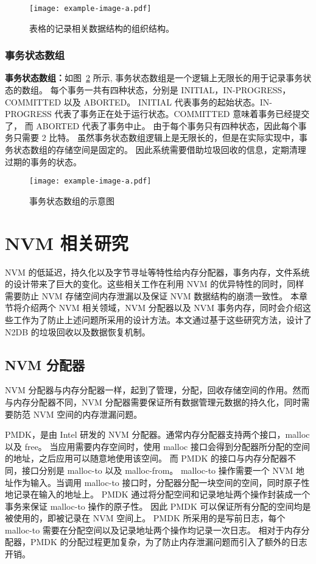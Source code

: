 \begin{figure}
    \centering
    \texttt{[image: example-image-a.pdf]}
    \caption{表格的记录相关数据结构的组织结构。}
    \label{fig:table}
\end{figure}

\subsubsection{事务状态数组}

\textbf{事务状态数组：}如图~\ref{fig:clog} 所示, 事务状态数组是一个逻辑上无限长的用于记录事务状态的数组。
每个事务一共有四种状态，分别是 INITIAL，IN-PROGRESS，COMMITTED 以及 ABORTED。
INITIAL 代表事务的起始状态。IN-PROGRESS 代表了事务正在处于运行状态。COMMITTED 意味着事务已经提交了，
而 ABORTED 代表了事务中止。
由于每个事务只有四种状态，因此每个事务只需要 2 比特。
虽然事务状态数组逻辑上是无限长的，但是在实际实现中，事务状态数组的存储空间是固定的。
因此系统需要借助垃圾回收的信息，定期清理过期的事务的状态。

\begin{figure}
    \centering
    \texttt{[image: example-image-a.pdf]}
    \caption{事务状态数组的示意图}
    \label{fig:clog}
\end{figure}


\section{NVM 相关研究}

NVM 的低延迟，持久化以及字节寻址等特性给内存分配器，事务内存，文件系统的设计带来了巨大的变化。这些相关工作在利用 NVM 的优异特性的同时，同样需要防止 NVM 存储空间内存泄漏以及保证 NVM 数据结构的崩溃一致性。
本章节将介绍两个 NVM 相关领域，NVM 分配器以及 NVM 事务内存，同时会介绍这些工作为了防止上述问题所采用的设计方法。本文通过基于这些研究方法，设计了 N2DB 的垃圾回收以及数据恢复机制。

\subsection{NVM 分配器}

NVM 分配器与内存分配器一样，起到了管理，分配，回收存储空间的作用。然而与内存分配器不同，NVM 分配器需要保证所有数据管理元数据的持久化，同时需要防范 NVM 空间的内存泄漏问题。

PMDK，是由 Intel 研发的 NVM 分配器\cite{pmdk}。通常内存分配器支持两个接口，malloc 以及 free。
当应用需要内存空间时，使用 malloc 接口会得到分配器所分配的空间的地址，之后应用可以随意地使用该空间。
而 PMDK 的接口与内存分配器不同，接口分别是 malloc-to 以及 malloc-from。
malloc-to 操作需要一个 NVM 地址作为输入。当调用 malloc-to 接口时，分配器分配一块空间的空间，同时原子性地记录在输入的地址上。
PMDK 通过将分配空间和记录地址两个操作封装成一个事务来保证 malloc-to 操作的原子性。
因此 PMDK 可以保证所有分配的空间均是被使用的，即被记录在 NVM 空间上。
PMDK 所采用的是写前日志，每个 malloc-to 需要在分配空间以及记录地址两个操作均记录一次日志。
相对于内存分配器，PMDK 的分配过程更加复杂，为了防止内存泄漏问题而引入了额外的日志开销。

